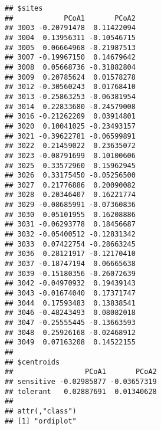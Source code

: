 \documentclass[
]{article}
\newenvironment{Shaded}{\begin{snugshade}}{\end{snugshade}}
\newcommand{\FloatTok}[1]{\textcolor[rgb]{0.00,0.00,0.81}{#1}}
\newcommand{\FunctionTok}[1]{\textcolor[rgb]{0.00,0.00,0.00}{#1}}
\newcommand{\NormalTok}[1]{#1}
\newcommand{\OtherTok}[1]{\textcolor[rgb]{0.56,0.35,0.01}{#1}}
\newcommand{\SpecialCharTok}[1]{\textcolor[rgb]{0.00,0.00,0.00}{#1}}
\newcommand{\StringTok}[1]{\textcolor[rgb]{0.31,0.60,0.02}{#1}}
\begin{document}
\begin{verbatim}
## $sites
##            PCoA1       PCoA2
## 3003 -0.20791478  0.11422094
## 3004  0.13956311 -0.10546715
## 3005  0.06664968 -0.21987513
## 3007 -0.19967150  0.14679642
## 3008  0.05668736 -0.31882804
## 3009  0.20785624  0.01578278
## 3012 -0.30560243  0.01768410
## 3013 -0.25863253 -0.06381954
## 3014  0.22833680 -0.24579008
## 3016 -0.21262209  0.03914801
## 3020  0.10041025 -0.23493157
## 3021 -0.39622781 -0.06599891
## 3022  0.21459022  0.23635072
## 3023 -0.08791699  0.10100606
## 3025  0.33572960  0.15962945
## 3026  0.33175450 -0.05256500
## 3027  0.21776886  0.20090082
## 3028  0.20346407  0.16221774
## 3029 -0.08685991 -0.07360836
## 3030  0.05101955  0.16208886
## 3031 -0.06293778  0.18456687
## 3032 -0.05400512 -0.12831342
## 3033  0.07422754 -0.28663245
## 3036  0.28121917 -0.12170410
## 3037 -0.18747194  0.06665638
## 3039 -0.15180356 -0.26072639
## 3042 -0.04970932  0.19439143
## 3043 -0.01674040  0.17371747
## 3044  0.17593483  0.13838541
## 3046 -0.48243493  0.08082018
## 3047 -0.25555445 -0.13663593
## 3048  0.25926168 -0.02468912
## 3049  0.07163208  0.14522155
## 
## $centroids
##                 PCoA1       PCoA2
## sensitive -0.02985877 -0.03657319
## tolerant   0.02887691  0.01340628
## 
## attr(,"class")
## [1] "ordiplot"
\end{verbatim}

\begin{Shaded}
\end{Shaded}
\end{document}
